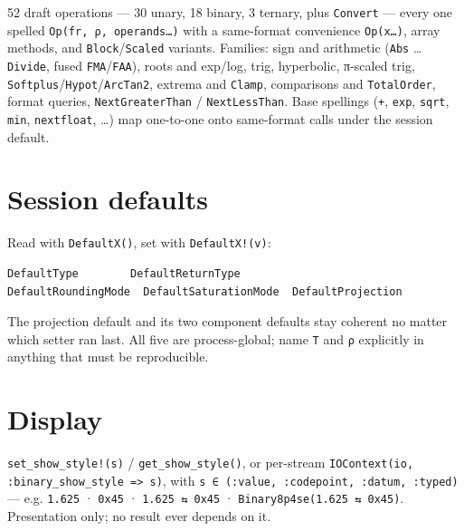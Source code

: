 \label{4250268531802119509}{}


52 draft operations — 30 unary, 18 binary, 3 ternary, plus \texttt{Convert} — every one spelled \texttt{Op(fr, ρ, operands…)} with a same-format convenience \texttt{Op(x…)}, array methods, and \texttt{Block}/\texttt{Scaled} variants. Families: sign and arithmetic (\texttt{Abs} … \texttt{Divide}, fused \texttt{FMA}/\texttt{FAA}), roots and exp/log, trig, hyperbolic, π-scaled trig, \texttt{Softplus}/\texttt{Hypot}/\texttt{ArcTan2}, extrema and \texttt{Clamp}, comparisons and \texttt{TotalOrder}, format queries, \texttt{NextGreaterThan} / \texttt{NextLessThan}. Base spellings (\texttt{+}, \texttt{exp}, \texttt{sqrt}, \texttt{min}, \texttt{nextfloat}, …) map one-to-one onto same-format calls under the session default.



\section{Session defaults}



\label{3970345369238056532}{}


Read with \texttt{DefaultX()}, set with \texttt{DefaultX!(v)}:




\begin{verbatim}
DefaultType        DefaultReturnType
DefaultRoundingMode  DefaultSaturationMode  DefaultProjection
\end{verbatim}



The projection default and its two component defaults stay coherent no matter which setter ran last. All five are process-global; name \texttt{T} and \texttt{ρ} explicitly in anything that must be reproducible.



\section{Display}



\label{12429740135947470305}{}


\texttt{set\_show\_style!(s)} / \texttt{get\_show\_style()}, or per-stream \texttt{IOContext(io, :binary\_show\_style => s)}, with \texttt{s ∈ (:value, :codepoint, :datum, :typed)} — e.g. \texttt{1.625} · \texttt{0x45} · \texttt{1.625 ⇆ 0x45} · \texttt{Binary8p4se(1.625 ⇆ 0x45)}. Presentation only; no result ever depends on it.



